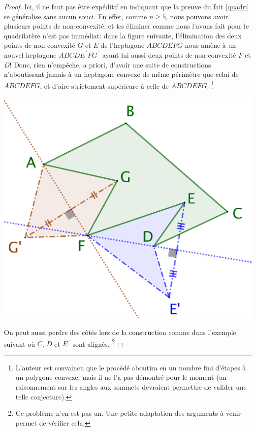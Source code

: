 \begin{proof}
	Ici, il ne faut pas être expéditif en indiquant que la preuve du fait \ref{quadri} se généralise sans aucun souci.
	En effet, comme $n \geq 5$, nous pouvons avoir plusieurs points de non-convexité, et les éliminer comme nous l'avons fait pour le quadrilatère n'est pas immédiat:
	dans la figure suivante, l'élimination des deux points de non convexité $G$ et $E$ de l'heptagone $ABCDEFG$ nous amène à un nouvel heptagone $ABCDE^{\,\prime}FG^{\,\prime}$ ayant lui aussi deux points de non-convexité $F$ et $D$!
	Donc, rien n'empêche, a priori, d'avoir une suite de constructions n'aboutissant jamais à un heptagone convexe
	de même périmètre que celui de $ABCDEFG$, et d'aire strictement supérieure à celle de $ABCDEFG$.%
	\footnote{
		L'auteur est convaincu que le procédé aboutira en un nombre fini d'étapes à un polygone convexe, mais il ne l'a pas démontré pour le moment (un raisonnement sur les angles aux sommets devraient permettre de valider une telle conjecture).
	}

	\begin{center}
		\includegraphics[scale=.4]{content/polygon/necessary-cond/non-convex-trap.png}
	\end{center}


	On peut aussi perdre des côtés lors de la construction comme dans l'exemple suivant où $C$, $D$ et $E^{\,\prime}$ sont alignés.%
	\footnote{
		Ce problème n'en est pas un. Une petite adaptation des arguments à venir permet de vérifier cela.
	}


\end{proof}
